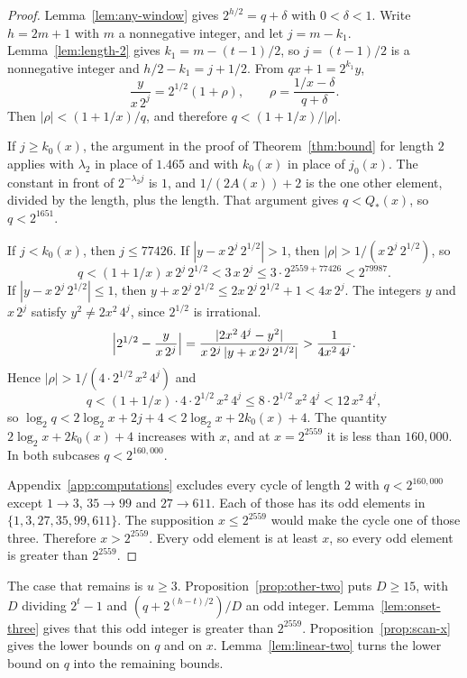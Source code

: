 \documentclass[11pt]{article}
\begin{document}
\begin{proof}
Lemma~\ref{lem:any-window} gives $2^{h/2} = q + \delta$ with $0 < \delta < 1$.
Write $h = 2m + 1$ with $m$ a nonnegative integer, and let $j = m - k_1$.
Lemma~\ref{lem:length-2} gives $k_1 = m - (t-1)/2$, so $j = (t-1)/2$ is a nonnegative integer and $h/2 - k_1 = j + 1/2$.
From $qx + 1 = 2^{k_1} y$,
\[
\frac{y}{x\, 2^{j}} = 2^{1/2}(1 + \rho), \qquad \rho = \frac{1/x - \delta}{q + \delta}.
\]
Then $|\rho| < (1 + 1/x)/q$, and therefore $q < (1 + 1/x)/|\rho|$.

If $j \ge k_0(x)$, the argument in the proof of Theorem~\ref{thm:bound} for length $2$ applies with $\lambda_2$ in place of $1.465$ and with $k_0(x)$ in place of $j_0(x)$.
The constant in front of $2^{-\lambda_2 j}$ is $1$, and $1/(2A(x)) + 2$ is the one other element, divided by the length, plus the length.
That argument gives $q < Q_*(x)$, so $q < 2^{1651}$.

If $j < k_0(x)$, then $j \le 77426$.
If $|y - x\, 2^{j}\, 2^{1/2}| > 1$, then $|\rho| > 1/(x\, 2^{j}\, 2^{1/2})$, so
\[
q < (1 + 1/x)\, x\, 2^{j}\, 2^{1/2} < 3\, x\, 2^{j} \le 3 \cdot 2^{2559 + 77426} < 2^{79987}.
\]
If $|y - x\, 2^{j}\, 2^{1/2}| \le 1$, then $y + x\, 2^{j}\, 2^{1/2} \le 2x\, 2^{j}\, 2^{1/2} + 1 < 4x\, 2^{j}$.
The integers $y$ and $x\, 2^{j}$ satisfy $y^2 \ne 2x^2\, 4^{j}$, since $2^{1/2}$ is irrational.
\[
\Bigl| 2^{1/2} - \frac{y}{x\, 2^{j}} \Bigr| = \frac{|2x^2\, 4^{j} - y^2|}{x\, 2^{j}\, |y + x\, 2^{j}\, 2^{1/2}|} > \frac{1}{4x^2\, 4^{j}}.
\]
Hence $|\rho| > 1/(4 \cdot 2^{1/2}\, x^2\, 4^{j})$ and
\[
q < (1 + 1/x) \cdot 4 \cdot 2^{1/2}\, x^2\, 4^{j} \le 8 \cdot 2^{1/2}\, x^2\, 4^{j} < 12\, x^2\, 4^{j},
\]
so $\log_2 q < 2\log_2 x + 2j + 4 < 2\log_2 x + 2k_0(x) + 4$.
The quantity $2\log_2 x + 2k_0(x) + 4$ increases with $x$, and at $x = 2^{2559}$ it is less than $160{,}000$.
In both subcases $q < 2^{160{,}000}$.

Appendix~\ref{app:computations} excludes every cycle of length $2$ with $q < 2^{160{,}000}$ except $1 \to 3$, $35 \to 99$ and $27 \to 611$.
Each of those has its odd elements in $\{1, 3, 27, 35, 99, 611\}$.
The supposition $x \le 2^{2559}$ would make the cycle one of those three.
Therefore $x > 2^{2559}$.
Every odd element is at least $x$, so every odd element is greater than $2^{2559}$.
\end{proof}

The case that remains is $u \ge 3$.
Proposition~\ref{prop:other-two} puts $D \ge 15$, with $D$ dividing $2^t - 1$ and $(q + 2^{(h - t)/2})/D$ an odd integer.
Lemma~\ref{lem:onset-three} gives that this odd integer is greater than $2^{2559}$.
Proposition~\ref{prop:scan-x} gives the lower bounds on $q$ and on $x$.
Lemma~\ref{lem:linear-two} turns the lower bound on $q$ into the remaining bounds.
\end{document}
